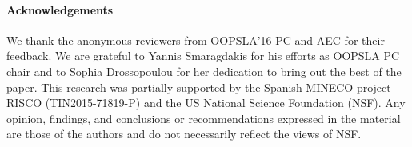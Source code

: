 \paragraph{Acknowledgements}


We thank the anonymous reviewers from OOPSLA'16 PC and AEC for their
feedback. 
%
We are grateful to Yannis Smaragdakis for his efforts as OOPSLA PC
chair and to Sophia Drossopoulou for her dedication to bring out the
best of the paper.
%
This research was partially supported by the Spanish MINECO project
RISCO (TIN2015-71819-P) and the US National Science Foundation
(NSF). Any opinion, findings, and conclusions or recommendations
expressed in the material are those of the authors and do not
necessarily reflect the views of NSF.



